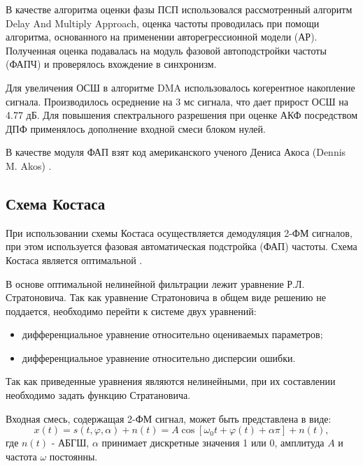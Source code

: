 В качестве алгоритма оценки фазы ПСП использовался
рассмотренный алгоритм Delay And Multiply Approach, оценка частоты проводилась при помощи алгоритма, основанного на применении авторегрессионной модели (АР).
Полученная оценка подавалась на модуль фазовой автоподстройки частоты (ФАПЧ) и проверялось вхождение в синхронизм.

Для увеличения ОСШ в алгоритме DMA использовалось когерентное накопление сигнала. Производилось осреднение на 3 мс сигнала, что дает прирост ОСШ на 4.77 дБ.
Для повышения спектрального разрешения при оценке АКФ посредством ДПФ применялось дополнение входной смеси блоком нулей.

В качестве модуля ФАП взят код американского ученого Дениса Акоса (Dennis M. Akos) \cite{sandiaproject}.
\subsection{Схема Костаса}

При использовании схемы Костаса осуществляется демодуляция 2-ФМ сигналов, при этом используется фазовая автоматическая подстройка (ФАП) частоты. Схема
Костаса является оптимальной \cite{shahtarin-wiener-kalman}.

В основе оптимальной нелинейной фильтрации лежит уравнение Р.Л. Стратоновича. Так как уравнение Стратоновича в общем виде решению не поддается, необходимо
перейти к системе двух уравнений:
\begin{itemize}
	\item дифференциальное уравнение относительно оцениваемых параметров;
	\item дифференциальное уравнение относительно дисперсии ошибки.
\end{itemize}

Так как приведенные уравнения являются нелинейными, при их составлении необходимо задать функцию Стратановича.

Входная смесь, содержащая 2-ФМ сигнал, может быть представлена в виде:
\begin{equation}
	x(t) = s(t, \varphi, \alpha) + n(t) = A \cos \left[ \omega_0t + \varphi(t) +\alpha \pi \right] + n(t),
	\label{eq:sec4_sig}
\end{equation}
где ${n(t)}$ - АБГШ, ${\alpha}$ принимает дискретные значения 1 или 0, амплитуда ${A}$ и частота ${\omega}$ постоянны.


